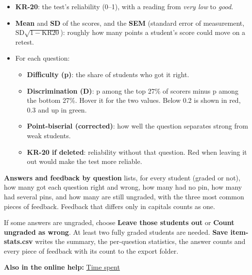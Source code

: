 \begin{itemize}[topsep=2pt, itemsep=2pt]
\item \textbf{KR-20}: the test's reliability (0--1), with a reading from \emph{very low} to \emph{good}.
\item \textbf{Mean} and \textbf{SD} of the scores, and the \textbf{SEM} (standard error of measurement, $\mathrm{SD}\sqrt{1-\mathrm{KR20}}$): roughly how many points a student's score could move on a retest.
\item For each question:
\begin{itemize}[topsep=1pt]
\item \textbf{Difficulty (p)}: the share of students who got it right.
\item \textbf{Discrimination (D)}: p among the top 27\% of scorers minus p among the bottom 27\%. Hover it for the two values. Below 0.2 is shown in red, 0.3 and up in green.
\item \textbf{Point-biserial (corrected)}: how well the question separates strong from weak students.
\item \textbf{KR-20 if deleted}: reliability without that question. Red when leaving it out would make the test more reliable.
\end{itemize}
\end{itemize}

\textbf{Answers and feedback by question} lists, for every student (graded or not), how many got each question right and wrong, how many had no pin, how many had several pins, and how many are still ungraded, with the three most common pieces of feedback. Feedback that differs only in capitals counts as one.

If some answers are ungraded, choose \textbf{Leave those students out} or \textbf{Count ungraded as wrong}. At least two fully graded students are needed. \textbf{Save item-stats.csv} writes the summary, the per-question statistics, the answer counts and every piece of feedback with its count to the export folder.

{\small\textbf{Also in the online help:} \href{https://github.com/agadin/micro-speed-grader/blob/main/docs/help/export.md\#time-spent}{Time spent}\,\onlinemark{}}
\tocon
